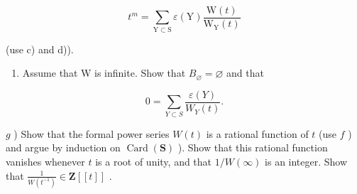 \[
t ^ {m} = \sum_ {\mathrm{Y} \subset \mathrm{S}} \varepsilon (\mathrm{Y}) \frac {\mathrm{W} (t)}{\mathrm{W} _ {\mathrm{Y}} (t)}
\]

(use c) and d)).

\begin{enumerate}
\def\labelenumi{\alph{enumi})}
\setcounter{enumi}{5}
\tightlist
\item
  Assume that W is infinite. Show that \(B_{\varnothing} = \varnothing\) and that
\end{enumerate}

\[
0 = \sum_ {Y \subset S} \frac {\varepsilon (Y)}{W _ {Y} (t)}.
\]

\(g\) ) Show that the formal power series \(W(t)\) is a rational function of \(t\) (use \(f\) ) and argue by induction on \(\operatorname{Card}(\mathbf{S})\) ). Show that this rational function vanishes whenever \(t\) is a root of unity, and that \(1 / W(\infty)\) is an integer. Show that \(\frac{1}{W(t^{-1})} \in \mathbf{Z}[[t]]\) .

